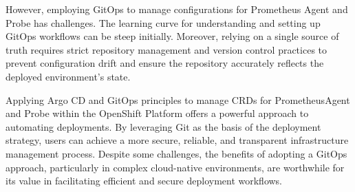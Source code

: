 However, employing GitOps to manage configurations for Prometheus Agent and Probe has challenges. The learning curve for understanding and setting up GitOps workflows can be steep initially. Moreover, relying on a single source of truth requires strict repository management and version control practices to prevent configuration drift and ensure the repository accurately reflects the deployed environment's state. 

Applying Argo CD and GitOps principles to manage CRDs for PrometheusAgent and Probe within the OpenShift Platform offers a powerful approach to automating deployments. By leveraging Git as the basis of the deployment strategy, users can achieve a more secure, reliable, and transparent infrastructure management process. Despite some challenges, the benefits of adopting a GitOps approach, particularly in complex cloud-native environments, are worthwhile for its value in facilitating efficient and secure deployment workflows. 